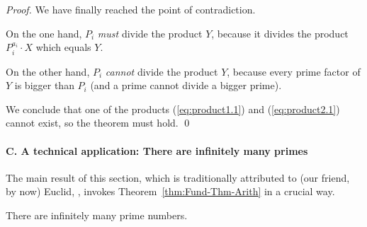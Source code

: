 \begin{proof}
We have finally reached the point of contradiction.

On the one hand, $P_i$ {\em must} divide the product $Y$, because it
divides the product $P_i^{a_i} \cdot X$ which equals $Y$.

On the other hand, $P_i$ {\em cannot} divide the product $Y$, because
every prime factor of $Y$ is bigger than $P_i$ (and a prime cannot
divide a bigger prime).

We conclude that one of the products (\ref{eq:product1.1}) and
(\ref{eq:product2.1}) cannot exist, so the theorem must hold.  \qed
\end{proof}


\paragraph{\small\sf C. A technical application: There are infinitely many primes}

The main result of this section, which is traditionally attributed to
(our friend, by now) Euclid, , invokes
Theorem~\ref{thm:Fund-Thm-Arith} in a crucial way.

\begin{prop}
\label{thm:infinite-primes}
There are infinitely many prime numbers.
\end{prop}

